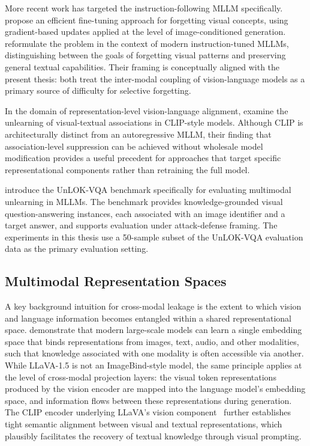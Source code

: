 \documentclass[12pt, a4paper]{article}
\begin{document}
More recent work has targeted the instruction-following MLLM specifically.
\citet{singleimage2024} propose an efficient fine-tuning approach for forgetting
visual concepts, using gradient-based updates applied at the level of image-conditioned
generation.
\citet{mmunlearner2025} reformulate the problem in the context of modern instruction-tuned
MLLMs, distinguishing between the goals of forgetting visual patterns and preserving
general textual capabilities.
Their framing is conceptually aligned with the present thesis: both treat
the inter-modal coupling of vision-language models as a primary source of difficulty for
selective forgetting.

In the domain of representation-level vision-language alignment, \citet{cliperase2024}
examine the unlearning of visual-textual associations in CLIP-style models.
Although CLIP is architecturally distinct from an autoregressive MLLM, their finding
that association-level suppression can be achieved without wholesale model modification
provides a useful precedent for approaches that target specific representational
components rather than retraining the full model.

\citet{unlok2025} introduce the UnLOK-VQA benchmark specifically for evaluating
multimodal unlearning in MLLMs.
The benchmark provides knowledge-grounded visual question-answering instances,
each associated with an image identifier and a target answer, and supports evaluation
under attack-defense framing.
The experiments in this thesis use a 50-sample subset of the UnLOK-VQA evaluation data
as the primary evaluation setting.

\subsection{Multimodal Representation Spaces}

A key background intuition for cross-modal leakage is the extent to which vision and
language information becomes entangled within a shared representational space.
\citet{imagebind2023} demonstrate that modern large-scale models can learn a single
embedding space that binds representations from images, text, audio, and other
modalities, such that knowledge associated with one modality is often accessible via
another.
While LLaVA-1.5 is not an ImageBind-style model, the same principle applies at the
level of cross-modal projection layers: the visual token representations produced by
the vision encoder are mapped into the language model's embedding space, and
information flows between these representations during generation.
The CLIP encoder underlying LLaVA's vision component~\citep{clip2021} further
establishes tight semantic alignment between visual and textual representations,
which plausibly facilitates the recovery of textual knowledge through visual prompting.
\end{document}
